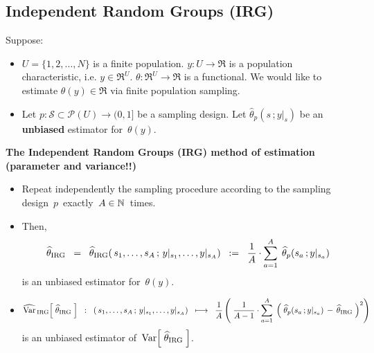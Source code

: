 

\subsection{Independent Random Groups (IRG)}

\vskip 0.2cm
Suppose:
\begin{itemize}
\item
	$U = \{1,2,\ldots,N\}$\; is a finite population.
	\;$y : U \longrightarrow \Re$\; is a population characteristic, i.e. \;$y \in \Re^{U}$.\;
	\;$\theta : \Re^{U} \longrightarrow \Re$\; is a functional.
	We would like to estimate \;$\theta(y) \in \Re$\; via finite population sampling.
\item
	Let \;$p : \mathcal{S} \subset \mathcal{P}(U) \longrightarrow (0,1]$\; be a sampling design.
	Let \;$\widehat{\theta}_{p}(s\,;y\vert_{s})$\; be an \textbf{\color{red}unbiased} estimator for \,$\theta(y)$.
\end{itemize}

\vskip 0.5cm
\noindent
\textbf{The Independent Random Groups (IRG) method of estimation (parameter and variance!!)}
\begin{itemize}
\item
	Repeat independently the sampling procedure according to the sampling design \,$p$\, exactly \,$A \in \mathbb{N}$\, times.
\item
	Then,
	\begin{equation*}
	\widehat{\theta}_{\textnormal{IRG}}
	\;\; = \;\;
		\widehat{\theta}_{\textnormal{IRG}}(\,s_{1},\ldots,s_{A}\,;\,y\vert_{s_{1}},\ldots,y\vert_{s_{A}})
	\;\; := \;\;
		\dfrac{1}{A}\cdot\overset{A}{\underset{a=1}{\sum}}\;\,\widehat{\theta}_{p}(s_{a}\,;y\vert_{s_{a}})
	\end{equation*}
	is an unbiased estimator for \,$\theta(y)$.
\item
	\begin{equation*}
	\widehat{\textnormal{Var}}_{\,\textnormal{IRG}}\!\left[\;\widehat{\theta}_{\textnormal{IRG}}\;\right]
	\;\; : \;\;
		(\,s_{1},\ldots,s_{A}\,;\,y\vert_{s_{1}},\ldots,y\vert_{s_{A}})
	\;\; \longmapsto \;\;
		\dfrac{1}{A}
		\left(\;
			\dfrac{1}{A-1}\cdot
			\overset{A}{\underset{a=1}{\sum}}\;
			\left(\;\widehat{\theta}_{p}(s_{a}\,;y\vert_{s_{a}}) \,-\, \widehat{\theta}_{\textnormal{IRG}}\;\right)^{2}
			\right)
	\end{equation*}
	is an unbiased estimator of \,$\textnormal{Var}\!\left[\;\widehat{\theta}_{\textnormal{IRG}}\;\right]$.
\end{itemize}

